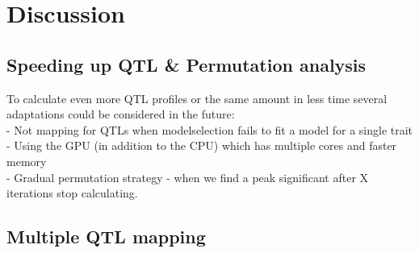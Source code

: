 \newpage
\section{Discussion}

\subsection{Speeding up QTL \& Permutation analysis}
To calculate even more QTL profiles or the same amount in less time several adaptations could be considered in the future:
\\- Not mapping for QTLs when modelselection fails to fit a model for a single trait
\\- Using the GPU (in addition to the CPU) which has multiple cores and faster memory
\\- Gradual permutation strategy - when we find a peak significant after X iterations stop calculating.
\subsection{Multiple QTL mapping}
